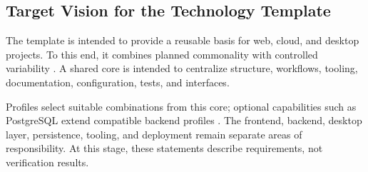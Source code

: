 \subsection{Target Vision for the Technology Template}
\label{subsec:zielbild-technologie-template}

The template is intended to provide a reusable basis for web, cloud, and
desktop projects. To this end, it combines planned commonality with controlled
variability
\parencite{krueger1992software-reuse,clements2001software-product-lines}.
A shared core is intended to centralize structure, workflows, tooling,
documentation, configuration, tests, and interfaces.

Profiles select suitable combinations from this core; optional capabilities
such as PostgreSQL extend compatible backend profiles
\parencite{kleiveist2026profiles}. The frontend, backend, desktop layer,
persistence, tooling, and deployment remain separate areas of responsibility.
At this stage, these statements describe requirements, not verification results.
